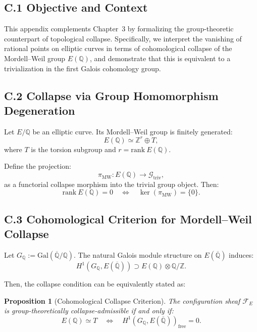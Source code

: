 \documentclass[11pt]{article}
\newtheorem{proposition}[theorem]{Proposition}
\begin{document}
\subsection*{C.1 Objective and Context}

This appendix complements Chapter~3 by formalizing the group-theoretic counterpart of topological collapse. Specifically, we interpret the vanishing of rational points on elliptic curves in terms of cohomological collapse of the Mordell–Weil group \( E(\mathbb{Q}) \), and demonstrate that this is equivalent to a trivialization in the first Galois cohomology group.

\subsection*{C.2 Collapse via Group Homomorphism Degeneration}

Let \( E/\mathbb{Q} \) be an elliptic curve. Its Mordell–Weil group is finitely generated:
\[
E(\mathbb{Q}) \simeq \mathbb{Z}^r \oplus T,
\]
where \( T \) is the torsion subgroup and \( r = \mathrm{rank}~E(\mathbb{Q}) \).

Define the projection:
\[
\pi_{\mathrm{MW}}: E(\mathbb{Q}) \longrightarrow \mathcal{G}_{\mathrm{triv}},
\]
as a functorial collapse morphism into the trivial group object. Then:
\[
\mathrm{rank}~E(\mathbb{Q}) = 0 \quad \Longleftrightarrow \quad \ker(\pi_{\mathrm{MW}}) = \{0\}.
\]

\subsection*{C.3 Cohomological Criterion for Mordell–Weil Collapse}

Let \( G_{\mathbb{Q}} := \mathrm{Gal}(\overline{\mathbb{Q}}/\mathbb{Q}) \). The natural Galois module structure on \( E(\overline{\mathbb{Q}}) \) induces:
\[
H^1(G_{\mathbb{Q}}, E(\overline{\mathbb{Q}})) \supset E(\mathbb{Q}) \otimes \mathbb{Q}/\mathbb{Z}.
\]

Then, the collapse condition can be equivalently stated as:

\begin{proposition}[Cohomological Collapse Criterion]
\label{prop:mordell-weil-collapse}
The configuration sheaf \( \mathcal{F}_E \) is group-theoretically collapse-admissible if and only if:
\[
E(\mathbb{Q}) \simeq T \quad \Longleftrightarrow \quad H^1(G_{\mathbb{Q}}, E(\overline{\mathbb{Q}}))_{\mathrm{free}} = 0.
\]
\end{proposition}
\end{document}
